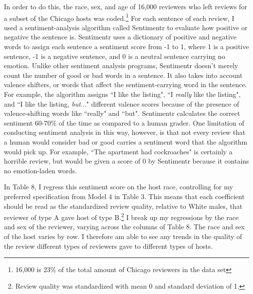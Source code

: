 \documentclass[11pt, oneside]{article}
\begin{document}
In order to do this, the race, sex, and age of 16,000 reviewers who left reviews for a subset of the Chicago hosts was coded.\footnote{16,000 is 23\% of the total amount of Chicago reviewers in the data set} For each sentence of each review, I used a sentiment-analysis algorithm called Sentimentr to evaluate how positive or negative the sentence is. Sentimentr uses a dictionary of positive and negative words to assign each sentence a sentiment score from -1 to 1, where 1 is a positive sentence, -1 is a negative sentence, and 0 is a neutral sentence carrying no emotion. Unlike other sentiment analysis programs, Sentimentr doesn't merely count the number of good or bad words in a sentence. It also takes into account valence shifters, or words that affect the sentiment-carrying word in the sentence. For example, the algorithm assigns ``I like the listing", ``I \textit{really} like the listing", and ``I like the listing, \textit{but}..." different valence scores because of the presence of valence-shifting words like ``really" and ``but". Sentimentr calculates the correct sentiment 60-70\% of the time as compared to a human grader. One limitation of conducting sentiment analysis in this way, however, is that not every review that a human would consider bad or good carries a sentiment word that the algorithm would pick up. For example, ``The apartment had cockroaches" is certainly a horrible review, but would be given a score of 0 by Sentimentr because it contains no emotion-laden words. 

In Table 8, I regress this sentiment score on the host race, controlling for my preferred specification from Model 4 in Table 3. This means that each coefficient should be read as the standardized review quality, relative to White males, that reviewer of type A gave host of type B.\footnote{Review quality was standardized with mean 0 and standard deviation of 1.} I break up my regressions by the race and sex of the reviewer, varying across the columns of Table 8. The race and sex of the host varies by row. I therefore am able to see any trends in the quality of the review different types of reviewers gave to different types of hosts. 
\end{document}
